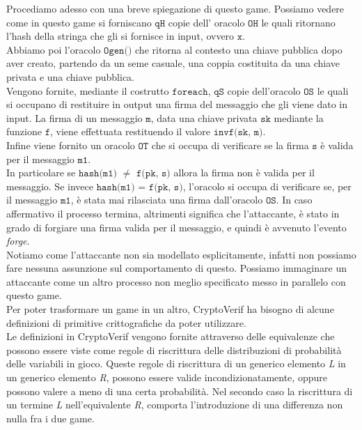 \documentclass[a4paper,openright,twoside,12pt]{report}
\begin{document}
Procediamo adesso con una breve spiegazione di questo game.
Possiamo vedere come in questo game si forniscano $\texttt{qH}$ copie dell' oracolo $\texttt{OH}$ le quali ritornano l'hash della stringa che gli si fornisce in input, ovvero $\texttt{x}$.\\
Abbiamo poi l'oracolo $\texttt{Ogen()}$ che ritorna al contesto una chiave pubblica dopo aver creato, partendo da un seme casuale, una coppia costituita da una chiave privata e una chiave pubblica.\\
Vengono fornite, mediante il costrutto $\texttt{foreach}$, $\texttt{qS}$ copie dell'oracolo $\texttt{OS}$ le quali si occupano di restituire in output una firma del messaggio che gli viene dato in input.
La firma di un messaggio $\texttt{m}$, data una chiave privata $\texttt{sk}$ mediante la funzione $\texttt{f}$, viene effettuata restituendo il valore $\texttt{invf(sk, m)}$.\\ 
Infine viene fornito un oracolo $\texttt{OT}$ che si occupa di verificare se la firma $\texttt{s}$ \`e valida per il messaggio $\texttt{m1}$. \\
In particolare se $\texttt{hash(m1)}$ $\neq$ $\texttt{f(pk, s)}$ allora la firma non \`e valida per il messaggio. Se invece $\texttt{hash(m1) = f(pk, s)}$,
l'oracolo si occupa di verificare se, per il messaggio $\texttt{m1}$, \`e stata mai rilasciata una firma dall'oracolo $\texttt{OS}$. In caso affermativo il processo termina, altrimenti significa che 
l'attaccante, \`e stato in grado di forgiare una firma valida per il messaggio, e quindi \`e avvenuto l'evento \emph{forge}.\\
Notiamo come l'attaccante non sia modellato esplicitamente, infatti non possiamo fare nessuna assunzione sul comportamento di questo.
Possiamo immaginare un attaccante come un altro processo non meglio specificato messo in parallelo con questo game.\\ 
Per poter trasformare un game in un altro, CryptoVerif ha bisogno di alcune definizioni di primitive crittografiche da poter utilizzare.
\\
Le definizioni in CryptoVerif vengono fornite attraverso delle equivalenze che possono essere viste come regole di riscrittura 
delle distribuzioni di probabilit\`a delle variabili in gioco.
Queste regole di riscrittura di un generico elemento \emph{L} in un generico elemento \emph{R}, possono essere valide incondizionatamente, 
oppure possono valere a meno di una certa probabilit\`a.
Nel secondo caso la riscrittura di un termine \emph{L} nell'equivalente \emph{R}, comporta l'introduzione di una differenza non nulla fra i due game.\\ 
\end{document}

